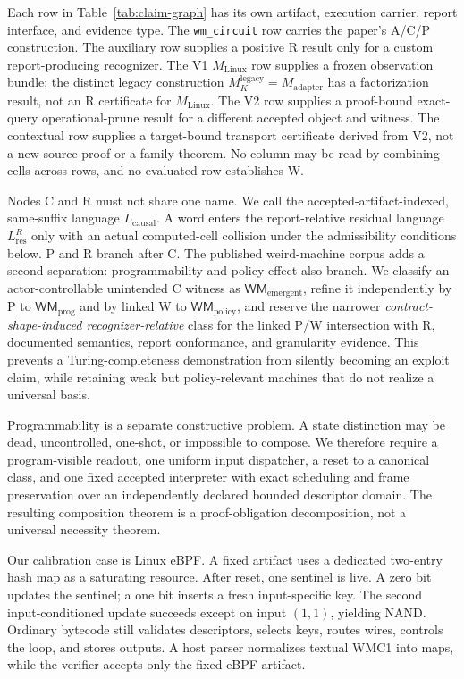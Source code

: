 \documentclass[conference]{IEEEtran}
\begin{document}
Each row in Table~\ref{tab:claim-graph} has its own artifact, execution carrier, report interface, and evidence type. The \texttt{wm\_circuit} row carries the paper's A/C/P construction. The auxiliary row supplies a positive R result only for a custom report-producing recognizer. The V1 $M_{\mathrm{Linux}}$ row supplies a frozen observation bundle; the distinct legacy construction $M_K^{\mathrm{legacy}}=M_{\mathrm{adapter}}$ has a factorization result, not an R certificate for $M_{\mathrm{Linux}}$. The V2 row supplies a proof-bound exact-query operational-prune result for a different accepted object and witness. The contextual row supplies a target-bound transport certificate derived from V2, not a new source proof or a family theorem. No column may be read by combining cells across rows, and no evaluated row establishes W.

Nodes C and R must not share one name. We call the accepted-artifact-indexed, same-suffix language $L_{\mathrm{causal}}$. A word enters the report-relative residual language $L_{\mathrm{res}}^R$ only with an actual computed-cell collision under the admissibility conditions below. P and R branch after C. The published weird-machine corpus adds a second separation: programmability and policy effect also branch. We classify an actor-controllable unintended C witness as $\mathsf{WM}_{\mathrm{emergent}}$, refine it independently by P to $\mathsf{WM}_{\mathrm{prog}}$ and by linked W to $\mathsf{WM}_{\mathrm{policy}}$, and reserve the narrower \emph{contract-shape-induced recognizer-relative} class for the linked P/W intersection with R, documented semantics, report conformance, and granularity evidence. This prevents a Turing-completeness demonstration from silently becoming an exploit claim, while retaining weak but policy-relevant machines that do not realize a universal basis.

Programmability is a separate constructive problem. A state distinction may be dead, uncontrolled, one-shot, or impossible to compose. We therefore require a program-visible readout, one uniform input dispatcher, a reset to a canonical class, and one fixed accepted interpreter with exact scheduling and frame preservation over an independently declared bounded descriptor domain. The resulting composition theorem is a proof-obligation decomposition, not a universal necessity theorem.

Our calibration case is Linux eBPF. A fixed artifact uses a dedicated two-entry hash map as a saturating resource. After reset, one sentinel is live. A zero bit updates the sentinel; a one bit inserts a fresh input-specific key. The second input-conditioned update succeeds except on input $(1,1)$, yielding NAND. Ordinary bytecode still validates descriptors, selects keys, routes wires, controls the loop, and stores outputs. A host parser normalizes textual WMC1 into maps, while the verifier accepts only the fixed eBPF artifact.
\end{document}
